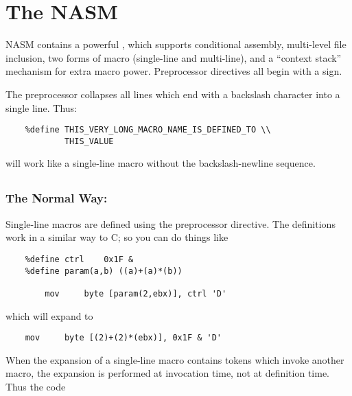 \chapter{The NASM }
\label{ch:preproc}

NASM contains a powerful , which supports
conditional assembly, multi-level file inclusion, two forms of macro
(single-line and multi-line), and a ``context stack'' mechanism for
extra macro power. Preprocessor directives all begin with a \code{\%}
sign.

The preprocessor collapses all lines which end with a backslash
\code{\textbackslash\textbackslash} character into a single line.
Thus:

\begin{lstlisting}
	%define THIS_VERY_LONG_MACRO_NAME_IS_DEFINED_TO \\
	        THIS_VALUE
\end{lstlisting}

will work like a single-line macro without the backslash-newline
sequence.

\section{}
\label{sec:slmacro}

\subsection{The Normal Way: }
\label{subsec:define}

Single-line macros are defined using the  preprocessor
directive. The definitions work in a similar way to C; so you can do
things like

\begin{lstlisting}
	%define ctrl    0x1F &
	%define param(a,b) ((a)+(a)*(b))

		mov     byte [param(2,ebx)], ctrl 'D'
\end{lstlisting}

which will expand to

\begin{lstlisting}
	mov     byte [(2)+(2)*(ebx)], 0x1F & 'D'
\end{lstlisting}

When the expansion of a single-line macro contains tokens which
invoke another macro, the expansion is performed at invocation time,
not at definition time. Thus the code

